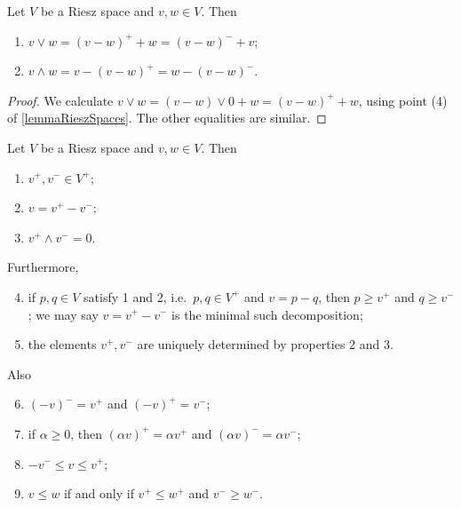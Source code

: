 \begin{lemma} \label{MeetJoinAsPositiveNegative}
Let $V$ be a Riesz space and $v,w\in V$. Then
\begin{enumerate}
\item $v\vee w = (v-w)^+ + w = (v-w)^- + v$;
\item $v\wedge w = v - (v-w)^+ = w - (v-w)^-$.
\end{enumerate}
\end{lemma}
\begin{proof}
We calculate $v\vee w = (v-w)\vee 0 + w = (v-w)^+ + w$, using point (4) of \ref{lemmaRieszSpaces}. The other equalities are similar.
\end{proof}

\begin{proposition} \label{PositiveNegativeElements} \label{minimalPositiveDecomposition} 
Let $V$ be a Riesz space and $v,w\in V$. Then
\begin{enumerate}
\item $v^+, v^- \in V^+$;
\item $v= v^+ - v^-$;
\item $v^+ \wedge v^- = 0$.
\end{enumerate}
Furthermore,
\begin{enumerate} \setcounter{enumi}{3}
\item if $p,q\in V$ satisfy 1 and 2, i.e.\ $p,q\in V^+$ and $v = p-q$, then $p \geq v^+$ and $q \geq v^-$; we may say $v=v^+-v^-$ is the minimal such decomposition; 
\item the elements $v^+, v^-$ are uniquely determined by properties 2 and 3. 
\end{enumerate}
Also
\begin{enumerate} \setcounter{enumi}{5}
\item $(-v)^- = v^+$ and $(-v)^+ = v^-$;
\item if $\alpha \geq 0$, then $(\alpha v)^+ = \alpha v^+$ and $(\alpha v)^- = \alpha v^-$;
\item $-v^- \leq v \leq v^+$;
\item $v\leq w$ \textup{if and only if} $v^+ \leq w^+$ and $v^- \geq w^-$.
\end{enumerate}
\end{proposition}
